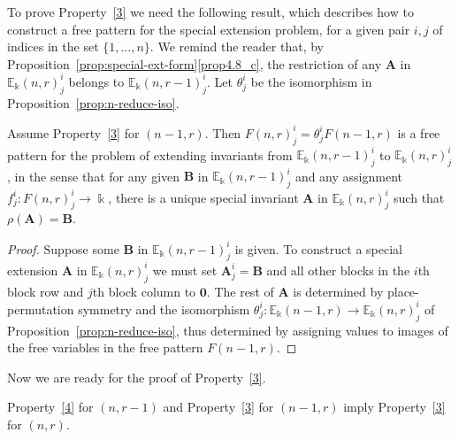 \documentclass[ALCO,ThmDefs,Unicode,epreuves]{cedram}
\newcommand{\E}{\mathbb{E}}
\newcommand{\bA}{\mathbf{A}}
\newcommand{\bB}{\mathbf{B}}
\newcommand{\bzero}{\mathbf{0}}
\begin{document}
To prove Property~\ref{3} we need the following result, which
describes how to construct a free pattern for the special extension
problem, for a given pair $i,j$ of indices in the set $\{1, \dots,
n\}$. We remind the reader that, by Proposition~\ref{prop:special-ext-form}\ref{prop4.8_c}, the restriction of any $\bA$ in
$\E_\Bbbk(n,r)^i_j$ belongs to $\E_\Bbbk(n,r-1)^i_j$. Let $\theta^i_j$
be the isomorphism in Proposition~\ref{prop:n-reduce-iso}.

\begin{lemm}\label{lem:free-special}
Assume Property~\ref{3} for $(n-1,r)$. Then $F(n,r)^i_j =
\theta^i_jF(n-1,r)$ is a free pattern for the problem of extending
invariants from $\E_\Bbbk(n,r-1)^i_j$ to $\E_\Bbbk(n,r)^i_j$, in the
sense that for any given $\bB$ in $\E_\Bbbk(n,r-1)^i_j$ and any
assignment $f^i_j: F(n,r)^i_j \to \Bbbk$, there is a unique special
invariant $\bA$ in $\E_\Bbbk(n,r)^i_j$ such that $\rho(\bA) = \bB$.
\end{lemm}

\begin{proof}
Suppose some $\bB$ in $\E_\Bbbk(n,r-1)^i_j$ is given. To construct a
special extension $\bA$ in $\E_\Bbbk(n,r)^i_j$ we must set $\bA^i_j =
\bB$ and all other blocks in the $i$th block row and $j$th block
column to $\bzero$. The rest of $\bA$ is determined by
place-permutation symmetry and the isomorphism $\theta^i_j:
\E_\Bbbk(n-1,r) \to \E_\Bbbk(n,r)^i_j$ of Proposition~\ref{prop:n-reduce-iso}, thus determined by assigning values to images
of the free variables in the free pattern $F(n-1,r)$.
\end{proof}


Now we are ready for the proof of Property~\ref{3}.

\begin{prop}\label{prop:free-ptns-exist}
 Property~\ref{4} for $(n,r-1)$ and Property~\ref{3} for $(n-1,r)$
 imply Property~\ref{3} for $(n,r)$.
\end{prop}
\end{document}
